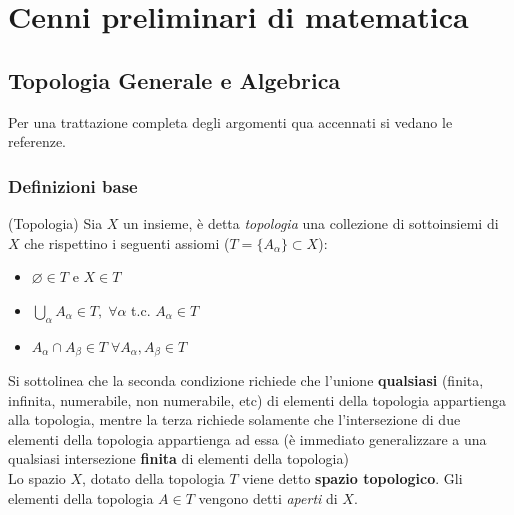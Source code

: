 \chapter{Cenni preliminari di matematica}
\section{Topologia Generale e Algebrica}
Per una trattazione completa degli argomenti qua accennati si vedano le referenze.

\subsection{Definizioni base}

\begin{definition}{(Topologia)}
  Sia $X$ un insieme, è detta \emph{topologia} una collezione di sottoinsiemi
  di $X$ che rispettino i seguenti assiomi ($T = \{A_\alpha\} \subset X$):
     \begin{itemize}
          \item $\varnothing \in T$ e $X \in T$
          \item $ \bigcup\limits_\alpha A_\alpha \in T, \;
             \forall \alpha $ t.c. $A_\alpha \in T$
          \item $ A_\alpha \cap A_\beta \in T \;
             \forall A_\alpha, A_\beta \in T$
     \end{itemize}
\end{definition}
Si sottolinea che la seconda condizione richiede che l'unione \textbf {qualsiasi}
(finita, infinita, numerabile, non numerabile, etc) di elementi della topologia
appartienga alla topologia, mentre la terza richiede solamente che l'intersezione
di due elementi della topologia appartienga ad essa (è immediato generalizzare
a una qualsiasi intersezione \textbf{finita} di elementi della topologia)\\

Lo spazio $X$, dotato della topologia $T$ viene detto \textbf{spazio topologico}.
Gli elementi della topologia $A \in T$ vengono detti \textit{aperti} di $X$.\\


